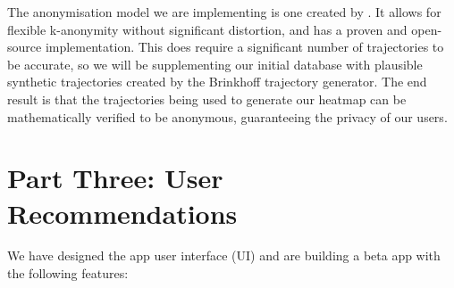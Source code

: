 \documentclass[11pt]{article}
\begin{document}
The anonymisation model we are implementing is one created by \cite{traject}. It allows for flexible k-anonymity without significant distortion, and has a proven and open-source implementation.
This does require a significant number of trajectories to be accurate, so we will be supplementing our initial database with plausible synthetic trajectories created by the Brinkhoff trajectory generator.
The end result is that the trajectories being used to generate our heatmap can be mathematically verified to be anonymous, guaranteeing the privacy of our users.


\section{Part Three: User Recommendations}



We have designed the app user interface (UI) and are building a beta app with the following features: 
\end{document}
